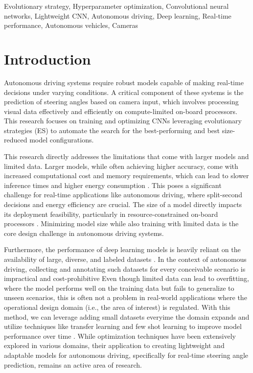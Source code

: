 \documentclass[conference]{IEEEtran}
\begin{document}
\begin{IEEEkeywords}
    Evolutionary strategy, Hyperparameter optimization, Convolutional neural networks, Lightweight CNN, Autonomous driving, Deep learning, Real-time performance, Autonomous vehicles, Cameras
\end{IEEEkeywords}

\section{Introduction}
Autonomous driving systems require robust models capable of making real-time decisions under varying conditions. A critical component of these systems is the prediction of steering angles based on camera input, which involves processing visual data effectively and efficiently on compute-limited on-board processors. This research focuses on training and optimizing CNNs leveraging evolutionary strategies (ES) to automate the search for the best-performing and best size-reduced model configurations.

This research directly addresses the limitations that come with larger models and limited data. Larger models, while often achieving higher accuracy, come with increased computational cost and memory requirements, which can lead to slower inference times and higher energy consumption \cite{bojarski2016endtoend}. This poses a significant challenge for real-time applications like autonomous driving, where split-second decisions and energy efficiency are crucial. The size of a model directly impacts its deployment feasibility, particularly in resource-constrained on-board processors \cite{b1}. Minimizing model size while also training with limited data is the core design challenge in autonomous driving systems.

Furthermore, the performance of deep learning models is heavily reliant on the availability of large, diverse, and labeled datasets \cite{b1}. In the context of autonomous driving, collecting and annotating such datasets for every conceivable scenario is impractical and cost-prohibitive \cite{b1} Even though limited data can lead to overfitting, where the model performs well on the training data but fails to generalize to unseen scenarios, this is often not a problem in real-world applications where the operational design domain (i.e., the area of interest) is regulated. With this method, we can leverage adding small datasets everyime the domain expands and utilize techniques like transfer learning and few shot learning to improve model performance over time \cite{b1}. While optimization techniques have been extensively explored in various domains, their application to creating lightweight and adaptable models for autonomous driving, specifically for real-time steering angle prediction, remains an active area of research.
\end{document}
